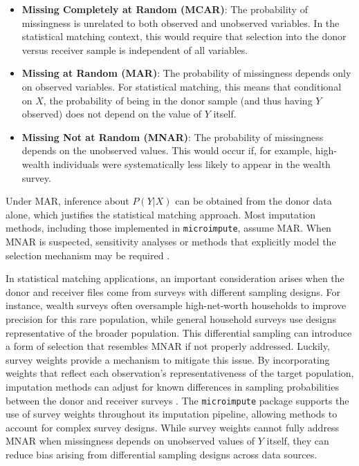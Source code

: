 \begin{itemize}
    \item \textbf{Missing Completely at Random (MCAR)}: The probability of missingness is unrelated to both observed and unobserved variables. In the statistical matching context, this would require that selection into the donor versus receiver sample is independent of all variables.

    \item \textbf{Missing at Random (MAR)}: The probability of missingness depends only on observed variables. For statistical matching, this means that conditional on $X$, the probability of being in the donor sample (and thus having $Y$ observed) does not depend on the value of $Y$ itself.

    \item \textbf{Missing Not at Random (MNAR)}: The probability of missingness depends on the unobserved values. This would occur if, for example, high-wealth individuals were systematically less likely to appear in the wealth survey.
\end{itemize}

Under MAR, inference about $P(Y|X)$ can be obtained from the donor data alone, which justifies the statistical matching approach. Most imputation methods, including those implemented in \texttt{microimpute}, assume MAR. When MNAR is suspected, sensitivity analyses or methods that explicitly model the selection mechanism may be required \citep{little2002statistical}.

In statistical matching applications, an important consideration arises when the donor and receiver files come from surveys with different sampling designs. For instance, wealth surveys often oversample high-net-worth households to improve precision for this rare population, while general household surveys use designs representative of the broader population. This differential sampling can introduce a form of selection that resembles MNAR if not properly addressed. Luckily, survey weights provide a mechanism to mitigate this issue. By incorporating weights that reflect each observation's representativeness of the target population, imputation methods can adjust for known differences in sampling probabilities between the donor and receiver surveys \citep{dugoff2014generalizing}. The \texttt{microimpute} package supports the use of survey weights throughout its imputation pipeline, allowing methods to account for complex survey designs. While survey weights cannot fully address MNAR when missingness depends on unobserved values of $Y$ itself, they can reduce bias arising from differential sampling designs across data sources.

